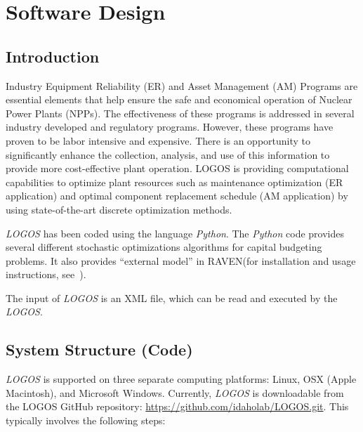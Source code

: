 \section{Software Design}
\subsection{Introduction}
Industry Equipment Reliability (ER) and Asset Management (AM) Programs are
essential elements that help ensure the safe and economical operation of
Nuclear Power Plants (NPPs). The effectiveness of these programs is addressed
in several industry developed and regulatory programs. However, these programs
have proven to be labor intensive and expensive. There is an opportunity to
significantly enhance the collection, analysis, and use of this information to
provide more cost-effective plant operation. LOGOS is providing computational
capabilities to optimize plant resources such as maintenance optimization
(ER application) and optimal component replacement schedule (AM application)
by using state-of-the-art discrete optimization methods.

\textit{LOGOS} has been coded using the language \textit{Python}.
The \textit{Python} code provides several different stochastic optimizations
algorithms for capital budgeting problems. It also provides ``external model''
in RAVEN(for installation and usage instructions, see~\cite{RAVENuserManual}).

The input of  \textit{LOGOS} is an XML file, which can be read and
executed by the  \textit{LOGOS}.

\subsection{System Structure (Code)}

\textit{LOGOS} is supported on three separate computing platforms:
Linux, OSX (Apple Macintosh), and Microsoft Windows. Currently, \textit{LOGOS}
is downloadable from the LOGOS GitHub repository:
\url{https://github.com/idaholab/LOGOS.git}. This typically involves the following steps:

